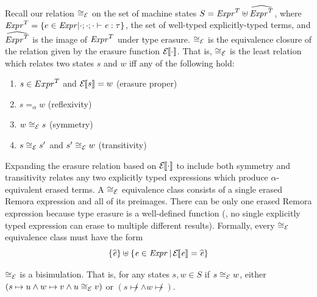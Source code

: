 Recall our relation $\cong_{\mathcal{E}}$ on the set of machine states $S = {\mathit{Expr}}^{T} \uplus \widehat{{\mathit{Expr}}^{T}}$,
where ${\mathit{Expr}}^{T} = \{e \in \mathit{Expr} | \cdot;\cdot;\cdot \vdash \mathit{e} : \mathit{\tau}\}$,
\ie the set of well-typed explicitly-typed terms,
and $\widehat{{\mathit{Expr}}^{T}}$ is the image of ${\mathit{Expr}}^{T}$ under type erasure.
$\cong_{\mathcal{E}}$ is the equivalence closure of the relation given by the erasure function $\mathcal{E}{\hskip-.25em}\left\llbracket \cdot \right\rrbracket$.
That is, $\cong_{\mathcal{E}}$ is the least relation which
relates two states $s$ and $w$ iff any of the following hold:
\begin{enumerate}
\item{$s \in {Expr}^{T}$ and $\mathcal{E}{\hskip-.25em}\left\llbracket s \right\rrbracket = w$ (erasure proper)}
\item{$s =_\alpha w$ (reflexivity)}
\item{$w \cong_{\mathcal{E}} s$ (symmetry)}
\item{$s \cong_{\mathcal{E}} s'$ and $s' \cong_{\mathcal{E}} w$ (transitivity)}
\end{enumerate}
Expanding the erasure relation based on $\mathcal{E}{\hskip-.25em}\left\llbracket \cdot \right\rrbracket$
to include both symmetry and transitivity
relates any two explicitly typed expressions
which produce $\alpha$-equivalent erased terms.
A $\cong_{\mathcal{E}}$ equivalence class consists of a single erased Remora expression
and all of its preimages.
There can be only one erased Remora expression because
type erasure is a well-defined function
(\ie, no single explicitly typed expression
can erase to multiple different results).
Formally, every $\cong_{\mathcal{E}}$ equivalence class must have the form
$$\{\widehat{\mathit{e}}\} \uplus \{\mathit{e} \in \mathit{Expr} \, | \, \mathcal{E}{\hskip-.25em}\left\llbracket \mathit{e} \right\rrbracket = \widehat{\mathit{e}}\}$$
\begin{theorem}
  \label{Bisimulation}
  $\cong_{\mathcal{E}}$ is a bisimulation.
  That is, for any states $s, w \in S$ if $s \cong_{\mathcal{E}} w$,
  either $(s \mapsto u \wedge w \mapsto v \wedge u \cong_{\mathcal{E}} v)$
  or $(s \not\mapsto \wedge w \not\mapsto)$.
\end{theorem}
